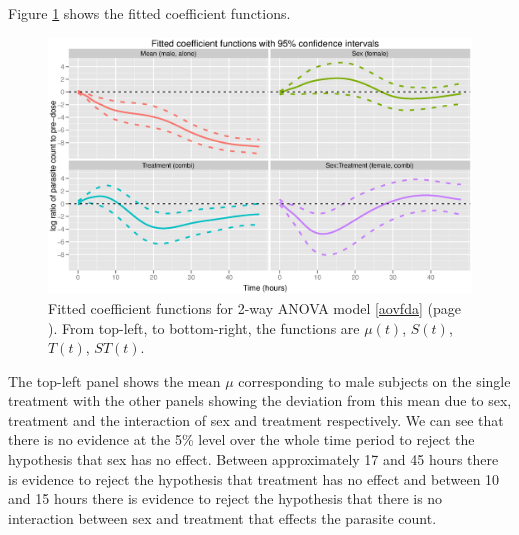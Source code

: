 Figure \ref{fdcoef} shows the fitted coefficient functions.
\begin{figure}[p]
\includegraphics[width=150mm]{fdcoef.eps} 
\caption{Fitted coefficient functions for 2-way ANOVA model \ref{aovfda} (page \pageref{aovfda}). From top-left, to bottom-right, the functions are $\mu(t)$, $S(t)$, $T(t)$, $ST(t)$.}
\label{fdcoef}
\end{figure}
 The top-left panel shows the mean $\mu$ corresponding to male subjects on the single treatment with the other panels showing the deviation from this mean due to sex, treatment and the interaction of sex and treatment respectively. We can see that there is no evidence at the 5\% level over the whole time period to reject the hypothesis that sex has no effect. Between approximately 17 and 45 hours there is evidence to reject the hypothesis that treatment has no effect and between 10 and 15 hours there is evidence to reject the hypothesis that there is no interaction between sex and treatment that effects the parasite count.
 
